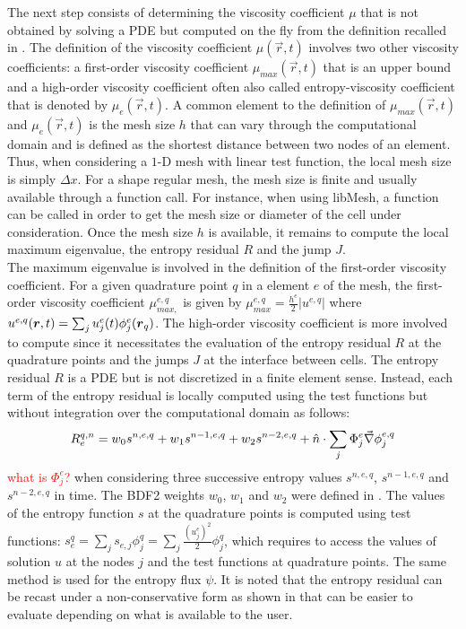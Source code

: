 The next step consists of determining the viscosity coefficient $\mu$ that is not obtained by solving a PDE but computed on the fly from the definition recalled in . The definition of the viscosity coefficient $\mu(\vec{r},t)$ involves two other viscosity coefficients: a first-order viscosity coefficient $\mu_{max}(\vec{r},t)$ that is an upper bound and a high-order viscosity coefficient often also called entropy-viscosity coefficient that is denoted by $\mu_e(\vec{r},t)$. A common element to the definition of $\mu_{max}(\vec{r},t)$ and $\mu_e(\vec{r},t)$ is the mesh size $h$ that can vary through the computational domain and is defined as the shortest distance between two nodes of an element. Thus, when considering a $1$-D mesh with linear test function, the local mesh size is simply $\Delta x$. For a shape regular mesh, the mesh size is finite and usually available through a function call. For instance, when using libMesh, a function can be called in order to get the mesh size or diameter of the cell under consideration. Once the mesh size $h$ is available, it remains to compute the local maximum eigenvalue, the entropy residual $R$ and the jump $J$. \\
The maximum eigenvalue is involved in the definition of the first-order viscosity coefficient. For a given quadrature point $q$ in a element $e$ of the mesh, the first-order viscosity coefficient $\mu_{max,}^{e,q}$ is given by  $\mu_{max}^{e,q} = \frac{h^e}{2} | u^{e,q} |$ where $u^{e,q}(\boldsymbol r,t) = \sum_j u_{j}^e(t) \phi^e_j(\boldsymbol r_q)$. The high-order viscosity coefficient is more involved to compute since it necessitates the evaluation of the entropy residual $R$ at the quadrature points and the jumps $J$ at the interface between cells. The entropy residual $R$ is a PDE but is not discretized in a finite element sense. Instead, each term of the entropy residual is locally computed using the test functions but without integration over the computational domain as follows:
%
\begin{equation}\label{eq:res_disc_sct2}
R_{e}^{q,n} = w_0 s^{n,e,q} + w_1 s^{n-1,e,q} + w_2 s^{n-2,e,q} +  \hat{n} \cdot  \sum_j \Phi_{j}^e\vec{\nabla} \phi^{e,q}_j
\end{equation}
\textcolor{red}{what is $\Phi_{j}^e$?}
when considering three successive entropy values $s^{n,e,q}$, $s^{n-1,e,q}$ and $s^{n-2,e,q}$ in time. The BDF2 weights $w_0$, $w_1$ and $w_2$ were defined in . The values of the entropy function $s$ at the quadrature points is computed using test functions: $s^q_e = \sum_j s_{e,j} \phi^q_j = \sum_j \frac{(u_{j}^e)^2}{2} \phi^q_j$, which requires to access the values of solution $u$ at the nodes $j$ and the test functions at quadrature points. The same method is used for the entropy flux $\psi$. It is noted that the entropy residual can be recast under a non-conservative form as shown in  that can be easier to evaluate depending on what is available to the user.
